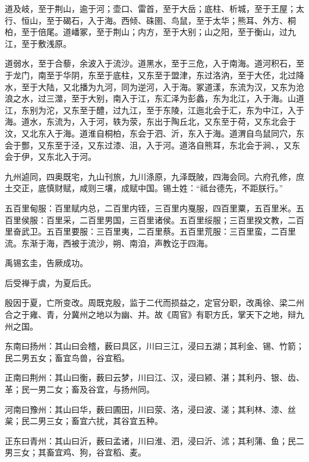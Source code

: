 \documentclass[12pt,UTF8]{ctexbook}
\begin{document}
道及岐，至于荆山，逾于河；壶口、雷首，至于大岳；底柱、析城，至于王屋；太行、恒山，至于碣石，入于海。西倾、硃圉、鸟鼠，至于太华；熊耳、外方、桐柏，至于倍尾。道嶓冢，至于荆山；内方，至于大别；山之阳，至于衡山，过九江，至于敷浅原。



道弱水，至于合藜，余波入于流沙。道黑水，至于三危，入于南海。道河积石，至于龙门，南至于华阴，东至于底柱，又东至于盟津，东过洛汭，至于大伾，北过降水，至于大陆，又北播为九河，同为逆河，入于海。冢道漾，东流为汉，又东为沧浪之水，过三澨，至于大别，南入于江，东汇泽为彭蠡，东为北江，入于海。山道江，东别为沱，又东至于醴，过九江，至于东陵，江迤北会于汇，东为中江，入于海。道水，东流为，入于河，轶为荥，东出于陶丘北，又东至于荷，又东北会于汶，又北东入于海。道淮自桐柏，东会于泗、沂，东入于海。道渭自鸟鼠同穴，东会于酆，又东至于泾，又东过漆、沮，入于河。道洛自熊耳，东北会于涧、，又东会于伊，又东北入于河。



九州逌同，四奥既宅，九山刊旅，九川涤原，九泽既陂，四海会同。六府孔修，庶土交正，底慎财赋，咸则三壤，成赋中国。锡土姓：“祗台德先，不距朕行。”



五百里甸服：百里赋内总，二百里内铚，三百里内戛服，四百里粟，五百里米。五百里侯服：百里采，二百里男国，三百里诸侯。五百里绥服；三百里揆文教，二百里奋武卫。五百里要服：三百里夷，二百里蔡。五百里荒服：三百里蛮，二百里流。东渐于海，西被于流沙，朔、南洎，声教讫于四海。



禹锡玄圭，告厥成功。



后受禅于虞，为夏后氏。



殷因于夏，亡所变改。周既克殷，监于二代而损益之，定官分职，改禹徐、梁二州合之于雍、青，分冀州之地以为幽、并。故《周官》有职方氏，掌天下之地，辩九州之国。



东南曰扬州：其山曰会稽，薮曰具区，川曰三江，浸曰五湖；其利金、锡、竹箭；民二男五女；畜宜鸟兽，谷宜稻。



正南曰荆州：其山曰衡，薮曰云梦，川曰江、汉，浸曰颍、湛；其利丹、银、齿、革；民一男二女；畜及谷宜，与扬州同。



河南曰豫州：其山曰华，薮曰圃田，川曰荥、洛，浸曰波、溠；其利林、漆、丝枲；民二男三女；畜宜六扰，其谷宜五种。



正东曰青州：其山曰沂，薮曰孟诸，川曰淮、泗，浸曰沂、沭；其利蒲、鱼；民二男三女；其畜宜鸡、狗，谷宜稻、麦。
\end{document}
